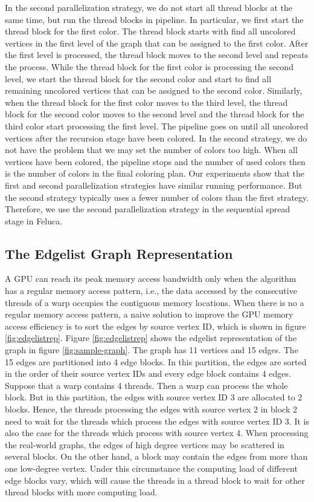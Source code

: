 In the second parallelization strategy, we do not start all thread blocks at the same time, but run the thread blocks in pipeline. In particular, we first start the thread block for the first color. The thread block starts with find all uncolored vertices in the first level of the graph that can be assigned to the first color. After the first level is processed, the thread block moves to the second level and repeats the process. While the thread block for the first color is processing the second level, we start the thread block for the second color and start to find all remaining uncolored vertices that can be assigned to the second color. Similarly, when the thread block for the first color moves to the third level, the thread block for the second color moves to the second level and the thread block for the third color start processing the first level. The pipeline goes on until all uncolored vertices after the recursion stage have been colored. In the second strategy, we do not have the problem that we may set the number of colors too high. When all vertices have been colored, the pipeline stops and the number of used colors then is the number of colors in the final coloring plan. Our experiments show that the first and second parallelization strategies have similar running performance. But the second strategy typically uses a fewer number of colors than the first strategy. Therefore, we use the second parallelization strategy in the sequential spread stage in Feluca. 

\subsection{The Edgelist Graph Representation}
\label{edgelist}
A GPU can reach its peak memory 
access bandwidth only when the algorithm has a regular memory access pattern, 
i.e., the data accessed by the consecutive threads of a warp occupies the 
contiguous memory locations. 
When there is no a regular memory access pattern, a naive solution to improve the GPU memory access efficiency is to sort 
the edges by source vertex ID, which is shown in figure \ref{fig:edgelistrep}. 
Figure \ref{fig:edgelistrep} shows the edgelist representation of the graph in figure \ref{fig:sample-graph}. 
The graph has 11 vertices and 15 edges. The 15 edges are partitioned into 4 edge blocks. In this partition, the edges are 
sorted in the order of their source vertex IDs and every edge block contains 4 edges. Suppose that 
a warp contains 4 threads. Then a warp can process the whole block.
But in this partition, the edges with source vertex ID 3 are allocated to 2 
blocks. Hence, the threads processing the edges with source vertex 2 in 
block 2 need to wait for the threads which process the edges with source 
vertex ID 3. It is also the case for the threads which process 
with source vertex 4. When processing the real-world graphs, the edges of 
high degree vertices may be scattered in several blocks. On the other hand, a block 
may contain the edges from more than one low-degree vertex. Under this circumstance the computing load of different edge blocks vary, which will cause 
the threads in a thread block to wait for other thread blocks with more computing load. 

